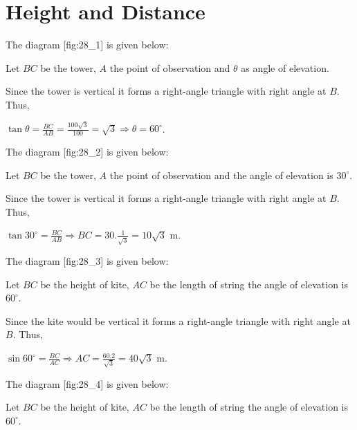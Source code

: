 \chapter{Height and Distance}
\startitemize[n]
\item The diagram [fig:28_1] is given below:

  \startplacefigure[reference=fig:28_1]
    \externalfigure[28_1.pdf]
  \stopplacefigure

  Let $BC$ be the tower, $A$ the point of observation and $\theta$ as angle of elevation.

  Since the tower is vertical it forms a right-angle triangle with right angle at $B$. Thus,

  $\tan\theta = \frac{BC}{AB} = \frac{100\sqrt{3}}{100} = \sqrt{3} \Rightarrow \theta = 60^\circ$.

\item The diagram [fig:28_2] is given below:

  \startplacefigure[reference=fig:28_2]
    \externalfigure[28_2.pdf]
  \stopplacefigure

  Let $BC$ be the tower, $A$ the point of observation and the angle of elevation is $30^\circ$.

  Since the tower is vertical it forms a right-angle triangle with right angle at $B$. Thus,

  $\tan30^\circ = \frac{BC}{AB} \Rightarrow BC = 30.\frac{1}{\sqrt{3}} = 10\sqrt{3}$ m.

\item The diagram [fig:28_3] is given below:

  \startplacefigure[reference=fig:28_3]
    \externalfigure[28_3.pdf]
  \stopplacefigure

  Let $BC$ be the height of kite, $AC$ be the length of string the angle of elevation is $60^\circ$.

  Since the kite would be vertical it forms a right-angle triangle with right angle at $B$. Thus,

  $\sin60^\circ = \frac{BC}{AC} \Rightarrow AC = \frac{60.2}{\sqrt{3}} = 40\sqrt{3}$ m.

\item The diagram [fig:28_4] is given below:

  \startplacefigure[reference=fig:28_4]
    \externalfigure[28_4.pdf]
  \stopplacefigure

  Let $BC$ be the height of kite, $AC$ be the length of string the angle of elevation is $60^\circ$.

